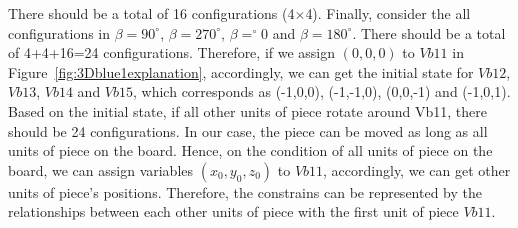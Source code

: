There should be a total of 16 configurations (4$\times$4). Finally, consider the all configurations in $\beta=90^{\circ}$, $\beta=270^{\circ}$, $\beta=^{\circ}0$ and $\beta=180^{\circ}$. There should be a total of 4+4+16=24 configurations.
Therefore, if we assign $(0,0,0)$ to $Vb11$ in Figure~\ref{fig:3Dblue1explanation}, accordingly, we can get the initial state for $Vb12$, $Vb13$, $Vb14$ and $Vb15$, which corresponds as (-1,0,0), (-1,-1,0), (0,0,-1) and (-1,0,1). Based on the initial state, if all other units of piece rotate around Vb11, there should be 24 configurations. In our case, the piece can be moved as long as all units of piece on the board. Hence, on the condition of all units of piece on the board, we can assign variables $(x_{0},y_{0},z_{0})$ to $Vb11$, accordingly, we can get other units of piece's positions. Therefore, the constrains can be represented by the relationships between each other units of piece with the first unit of piece $Vb11$.
